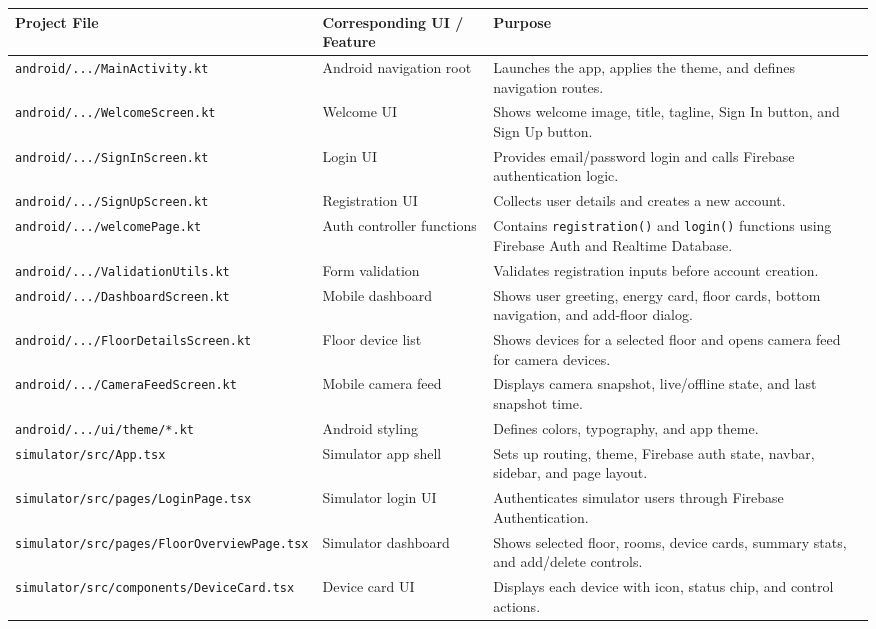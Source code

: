 \documentclass[11pt,a4paper]{article}
\begin{document}
\begin{longtable}{@{}p{5.2cm}p{3.5cm}p{5.2cm}@{}}
\toprule
\textbf{Project File} & \textbf{Corresponding UI / Feature} & \textbf{Purpose} \\
\midrule
\endhead
\texttt{android/.../MainActivity.kt} & Android navigation root & Launches the app, applies the theme, and defines navigation routes. \\
\texttt{android/.../WelcomeScreen.kt} & Welcome UI & Shows welcome image, title, tagline, Sign In button, and Sign Up button. \\
\texttt{android/.../SignInScreen.kt} & Login UI & Provides email/password login and calls Firebase authentication logic. \\
\texttt{android/.../SignUpScreen.kt} & Registration UI & Collects user details and creates a new account. \\
\texttt{android/.../welcomePage.kt} & Auth controller functions & Contains \texttt{registration()} and \texttt{login()} functions using Firebase Auth and Realtime Database. \\
\texttt{android/.../ValidationUtils.kt} & Form validation & Validates registration inputs before account creation. \\
\texttt{android/.../DashboardScreen.kt} & Mobile dashboard & Shows user greeting, energy card, floor cards, bottom navigation, and add-floor dialog. \\
\texttt{android/.../FloorDetailsScreen.kt} & Floor device list & Shows devices for a selected floor and opens camera feed for camera devices. \\
\texttt{android/.../CameraFeedScreen.kt} & Mobile camera feed & Displays camera snapshot, live/offline state, and last snapshot time. \\
\texttt{android/.../ui/theme/*.kt} & Android styling & Defines colors, typography, and app theme. \\
\texttt{simulator/src/App.tsx} & Simulator app shell & Sets up routing, theme, Firebase auth state, navbar, sidebar, and page layout. \\
\texttt{simulator/src/pages/LoginPage.tsx} & Simulator login UI & Authenticates simulator users through Firebase Authentication. \\
\texttt{simulator/src/pages/FloorOverviewPage.tsx} & Simulator dashboard & Shows selected floor, rooms, device cards, summary stats, and add/delete controls. \\
\texttt{simulator/src/components/DeviceCard.tsx} & Device card UI & Displays each device with icon, status chip, and control actions. \\

\end{longtable}
\end{document}
